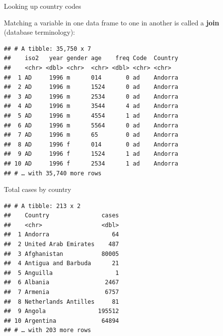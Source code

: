 \documentclass[
  ignorenonframetext,
]{beamer}
\newenvironment{Shaded}{\begin{snugshade}}{\end{snugshade}}
\newcommand{\DataTypeTok}[1]{\textcolor[rgb]{0.13,0.29,0.53}{#1}}
\newcommand{\KeywordTok}[1]{\textcolor[rgb]{0.13,0.29,0.53}{\textbf{#1}}}
\newcommand{\NormalTok}[1]{#1}
\newcommand{\OperatorTok}[1]{\textcolor[rgb]{0.81,0.36,0.00}{\textbf{#1}}}
\newcommand{\StringTok}[1]{\textcolor[rgb]{0.31,0.60,0.02}{#1}}
\begin{document}
\begin{frame}[fragile]{Looking up country codes}
\protect\hypertarget{looking-up-country-codes}{}

Matching a variable in one data frame to one in another is called a
\textbf{join} (database terminology):

\begin{Shaded}
\end{Shaded}

\begin{verbatim}
## # A tibble: 35,750 x 7
##    iso2   year gender age    freq Code  Country
##    <chr> <dbl> <chr>  <chr> <dbl> <chr> <chr>  
##  1 AD     1996 m      014       0 ad    Andorra
##  2 AD     1996 m      1524      0 ad    Andorra
##  3 AD     1996 m      2534      0 ad    Andorra
##  4 AD     1996 m      3544      4 ad    Andorra
##  5 AD     1996 m      4554      1 ad    Andorra
##  6 AD     1996 m      5564      0 ad    Andorra
##  7 AD     1996 m      65        0 ad    Andorra
##  8 AD     1996 f      014       0 ad    Andorra
##  9 AD     1996 f      1524      1 ad    Andorra
## 10 AD     1996 f      2534      1 ad    Andorra
## # … with 35,740 more rows
\end{verbatim}

\end{frame}

\begin{frame}[fragile]{Total cases by country}
\protect\hypertarget{total-cases-by-country}{}

\begin{Shaded}
\end{Shaded}

\begin{verbatim}
## # A tibble: 213 x 2
##    Country               cases
##    <chr>                 <dbl>
##  1 Andorra                  64
##  2 United Arab Emirates    487
##  3 Afghanistan           80005
##  4 Antigua and Barbuda      21
##  5 Anguilla                  1
##  6 Albania                2467
##  7 Armenia                6757
##  8 Netherlands Antilles     81
##  9 Angola               195512
## 10 Argentina             64894
## # … with 203 more rows
\end{verbatim}

\end{frame}
\end{document}
